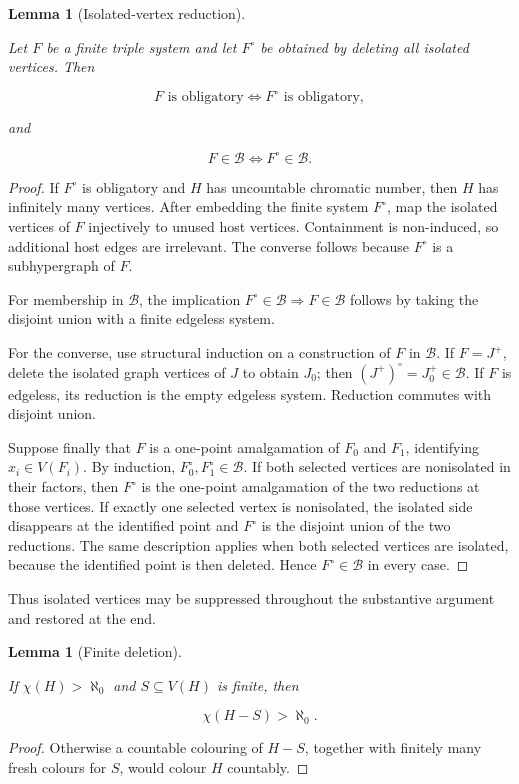\documentclass[a4paper,11pt,reqno]{amsart}
\theoremstyle{plain}
\newtheorem{lemma}[theorem]{Lemma}
\theoremstyle{definition}
\theoremstyle{remark}
\begin{document}
\begin{lemma}[Isolated-vertex reduction]\label{lemma-1.1-isolated-vertex-reduction}

Let \(F\) be a finite triple system and let \(F^\circ\) be obtained by deleting all isolated vertices. Then

\[
F\text{ is obligatory}\iff F^\circ\text{ is obligatory},
\]

and

\[
F\in\mathcal B\iff F^\circ\in\mathcal B.
\]

\end{lemma}
\begin{proof}
If \(F^\circ\) is obligatory and \(H\) has uncountable chromatic number, then \(H\) has infinitely many vertices. After embedding the finite system \(F^\circ\), map the isolated vertices of \(F\) injectively to unused host vertices. Containment is non-induced, so additional host edges are irrelevant. The converse follows because \(F^\circ\) is a subhypergraph of \(F\).

For membership in \(\mathcal B\), the implication \(F^\circ\in\mathcal B\Rightarrow F\in\mathcal B\) follows by taking the disjoint union with a finite edgeless system.

For the converse, use structural induction on a construction of \(F\) in \(\mathcal B\). If \(F=J^+\), delete the isolated graph vertices of \(J\) to obtain \(J_0\); then \((J^+)^\circ=J_0^+\in\mathcal B\). If \(F\) is edgeless, its reduction is the empty edgeless system. Reduction commutes with disjoint union.

Suppose finally that \(F\) is a one-point amalgamation of \(F_0\) and
\(F_1\), identifying \(x_i\in V(F_i)\). By induction,
\(F_0^\circ,F_1^\circ\in\mathcal B\). If both selected vertices are
nonisolated in their factors, then \(F^\circ\) is the one-point amalgamation
of the two reductions at those vertices. If exactly one selected vertex is
nonisolated, the isolated side disappears at the identified point and
\(F^\circ\) is the disjoint union of the two reductions. The same description
applies when both selected vertices are isolated, because the identified
point is then deleted. Hence \(F^\circ\in\mathcal B\) in every case.
\end{proof}

Thus isolated vertices may be suppressed throughout the substantive argument and restored at the end.

\begin{lemma}[Finite deletion]\label{lemma-1.2-finite-deletion}

If \(\chi(H)>\aleph_0\) and \(S\subseteq V(H)\) is finite, then

\[
\chi(H-S)>\aleph_0.
\]

\end{lemma}
\begin{proof}
Otherwise a countable colouring of \(H-S\), together with finitely many fresh colours for \(S\), would colour \(H\) countably.
\end{proof}
\end{document}
